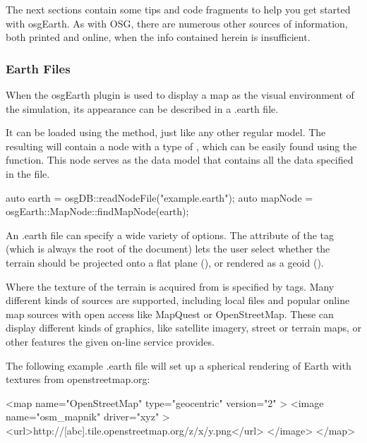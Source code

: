 The next sections contain some tips and code fragments to help you get
started with osgEarth. As with OSG, there are numerous other sources of
information, both printed and online, when the info contained herein
is insufficient.


\subsubsection{Earth Files}

When the osgEarth plugin is used to display a map as the visual environment
of the simulation, its appearance can be described in a .earth file.

It can be loaded using the  method, just like any
other regular model. The resulting  will contain a node with a
type of , which can be easily found using the
 function. This node serves as the
data model that contains all the data specified in the  file.

\begin{cpp}
auto earth = osgDB::readNodeFile("example.earth");
auto mapNode = osgEarth::MapNode::findMapNode(earth);
\end{cpp}

An .earth file can specify a wide variety of options. The  attribute
of the  tag (which is always the root of the document) lets the user
select whether the terrain should be projected onto a flat plane (),
or rendered as a geoid ().

Where the texture of the terrain is acquired from is specified by 
tags. Many different kinds of sources are supported, including local files and
popular online map sources with open access like MapQuest or OpenStreetMap.
These can display different kinds of graphics, like satellite imagery, street
or terrain maps, or other features the given on-line service provides.

The following example .earth file will set up a spherical rendering of Earth
with textures from openstreetmap.org:

\begin{filelisting}
<map name="OpenStreetMap" type="geocentric" version="2" >
    <image name="osm_mapnik" driver="xyz" >
        <url>http://[abc].tile.openstreetmap.org/{z}/{x}/{y}.png</url>
    </image>
</map>
\end{filelisting}


